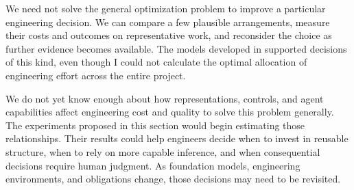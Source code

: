 
We need not solve the general optimization problem to improve a particular engineering decision. We can compare a few plausible arrangements, measure their costs and outcomes on representative work, and reconsider the choice as further evidence becomes available. The models developed in  supported decisions of this kind, even though I could not calculate the optimal allocation of engineering effort across the entire project.

We do not yet know enough about how representations, controls, and agent capabilities affect engineering cost and quality to solve this problem generally. The experiments proposed in this section would begin estimating those relationships. Their results could help engineers decide when to invest in reusable structure, when to rely on more capable inference, and when consequential decisions require human judgment. As foundation models, engineering environments, and obligations change, those decisions may need to be revisited.
